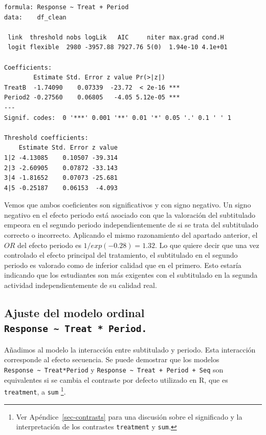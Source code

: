 \documentclass[
  12pt,
  a4paper,
  extrafontsizes,
  onecolumn,
  openright]{memoir}
\begin{document}
\begin{verbatim}
formula: Response ~ Treat + Period
data:    df_clean

 link  threshold nobs logLik   AIC     niter max.grad cond.H 
 logit flexible  2980 -3957.88 7927.76 5(0)  1.94e-10 4.1e+01

Coefficients:
        Estimate Std. Error z value Pr(>|z|)    
TreatB  -1.74090    0.07339  -23.72  < 2e-16 ***
Period2 -0.27560    0.06805   -4.05 5.12e-05 ***
---
Signif. codes:  0 '***' 0.001 '**' 0.01 '*' 0.05 '.' 0.1 ' ' 1

Threshold coefficients:
    Estimate Std. Error z value
1|2 -4.13085    0.10507 -39.314
2|3 -2.60905    0.07872 -33.143
3|4 -1.81652    0.07073 -25.681
4|5 -0.25187    0.06153  -4.093
\end{verbatim}

\normalsize

Vemos que ambos coeficientes son significativos y con signo negativo. Un
signo negativo en el efecto periodo está asociado con que la valoración
del subtitulado empeora en el segundo periodo independientemente de si
se trata del subtitulado correcto o incorrecto. Aplicando el mismo
razonamiento del apartado anterior, el \(OR\) del efecto periodo es
\(1/exp(-0.28) = 1.32\). Lo que quiere decir que una vez controlado el
efecto principal del tratamiento, el subtitulado en el segundo periodo
es valorado como de inferior calidad que en el primero. Esto estaría
indicando que los estudiantes son más exigentes con el subtitulado en la
segunda actividad independientemente de su calidad real.

\hypertarget{ajuste-del-modelo-ordinal-response-treat-period.-1}{%
\subsection{\texorpdfstring{Ajuste del modelo ordinal
\texttt{Response\ \textasciitilde{}\ Treat\ *\ Period.}}{Ajuste del modelo ordinal Response \textasciitilde{} Treat * Period.}}\label{ajuste-del-modelo-ordinal-response-treat-period.-1}}

Añadimos al modelo la interacción entre subtitulado y periodo. Esta
interacción corresponde al efecto secuencia. Se puede demostrar que los
modelos \texttt{Response\ \textasciitilde{}\ Treat*Period} y
\texttt{Response\ \textasciitilde{}\ Treat\ +\ Period\ +\ Seq} son
equivalentes si se cambia el contraste por defecto utilizado en R, que
es \texttt{treatment}, a \texttt{sum} \footnote{Ver
  Apéndice~\ref{sec-contrasts} para una discusión sobre el significado y
  la interpretación de los contrastes \texttt{treatment} y \texttt{sum}.}.
\end{document}
